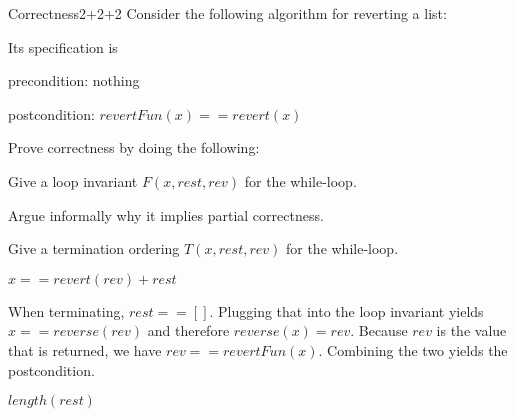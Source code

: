 \documentclass[a4paper]{article}
\begin{document}
\header

\begin{problem}{Correctness}{2+2+2}
Consider the following algorithm for reverting a list:
\begin{acode}
\end{acode}

Its specification is
\begin{compactitem}
 \item precondition: nothing
 \item postcondition: $revertFun(x)==revert(x)$
\end{compactitem}

Prove correctness by doing the following:
\begin{compactenum}
 \item Give a loop invariant $F(x,rest,rev)$ for the while-loop.
 \item Argue informally why it implies partial correctness. 
 \item Give a termination ordering $T(x,rest,rev)$ for the while-loop.
\end{compactenum}

\begin{solution}
\begin{compactenum}
 \item $x==revert(rev)+rest$
 \item When terminating, $rest==[]$. Plugging that into the loop invariant yields $x==reverse(rev)$ and therefore $reverse(x)=rev$.
 Because $rev$ is the value that is returned, we have $rev==revertFun(x)$.
 Combining the two yields the postcondition.
 \item $length(rest)$
\end{compactenum}
\end{solution}
\end{problem}
\end{document}
